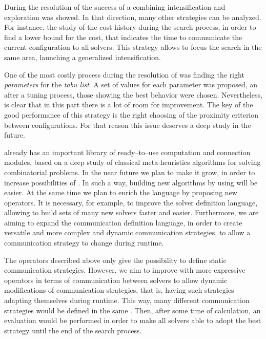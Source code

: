 During the resolution of \sgp{} the success of a \comstr{} combining intensification and exploration was showed. In that direction, many other strategies can be analyzed. For instance, the study of the cost history during the search process, in order to find a lower bound for the cost, that indicates the time to communicate the current configuration to all solvers. This strategy allows to focus the search in the same area, launching a generalized intensification.


One of the most costly process during the resolution of \grp{} was finding the right {\it parameters} for the \textit{tabu list}. A set of values for each parameter was proposed, an after a tuning process, those showing the best behavior were chosen. Nevertheless, is clear that in this part there is a lot of room for improvement. The key of the good performance of this strategy is the right choosing of the proximity criterion between configurations. For that reason this issue deserves a deep study in the future.

\posl{} already has an important library of ready--to--use computation and connection modules, based on a deep study of classical meta-heuristics algorithms for solving combinatorial problems. In the near future we plan to make it grow, in order to increase possibilities of \posl{}. In such a way, building new algorithms by using \posl{} will be easier. At the same time we plan to enrich the language by proposing new operators. It is necessary, for example, to improve the solver definition language, allowing to build sets of many new solvers faster and easier. Furthermore, we are aiming to expand the communication definition language, in order to create versatile and more complex and dynamic communication strategies, to allow a communication strategy to change during runtime.

The operators described above only give the possibility to define static communication strategies. However, we aim to improve \posl{} with more expressive operators in terms of communication between solvers to allow dynamic modifications of communication strategies, that is, having such strategies adapting themselves during runtime. This way, many different communication strategies would be defined in the same \soset. Then, after some time of calculation, an evaluation would be performed in order to make all solvers able to adopt the best strategy until the end of the search process.

